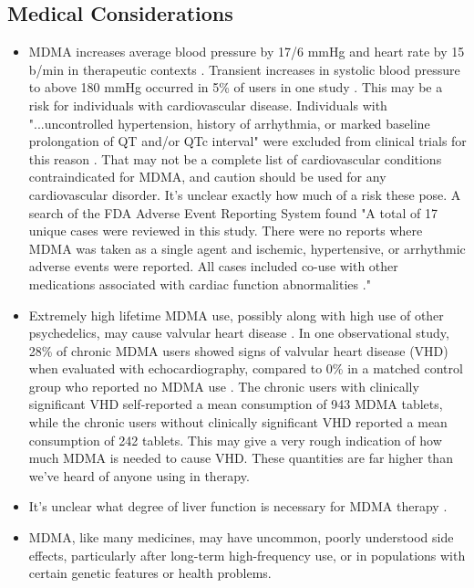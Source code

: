 \documentclass[12pt,letterpaper]{book}
\begin{document}
\subsection*{Medical Considerations}
\begin{itemize}
    \item MDMA increases average blood pressure by 17/6 mmHg and heart rate by 15 b/min in therapeutic contexts \cite{mitchellMDMAClinicalTrial}. Transient increases in systolic blood pressure to above 180 mmHg occurred in 5\% of users in one study \cite{vizeliActuteEffects}. This may be a risk for individuals with cardiovascular disease. Individuals with "...uncontrolled hypertension, history of arrhythmia, or marked baseline prolongation of QT and/or QTc interval" were excluded from clinical trials for this reason \cite{mitchellMDMAClinicalTrial2}. That may not be a complete list of cardiovascular conditions contraindicated for MDMA, and caution should be used for any cardiovascular disorder. It's unclear exactly how much of a risk these pose. A search of the FDA Adverse Event Reporting System found "A total of 17 unique cases were reviewed in this study. There were no reports where MDMA was taken as a single agent and ischemic, hypertensive, or arrhythmic adverse events were reported. All cases included co-use with other medications associated with cardiac function abnormalities \cite{makunts2023concomitant}."
    \item Extremely high lifetime MDMA use, possibly along with high use of other psychedelics, may cause valvular heart disease \cite{droogmans2007valvular,tagen2023valvular}. In one observational study, 28\% of chronic MDMA users showed signs of valvular heart disease (VHD) when evaluated with echocardiography, compared to 0\% in a matched control group who reported no MDMA use \cite{droogmans2007valvular}. The chronic users with clinically significant VHD self-reported a mean consumption of 943 MDMA tablets, while the chronic users without clinically significant VHD reported a mean consumption of 242 tablets. This may give a very rough indication of how much MDMA is needed to cause VHD. These quantities are far higher than we've heard of anyone using in therapy.
    \item It's unclear what degree of liver function is necessary for MDMA therapy \cite{krausCirrhosis}.
    \item MDMA, like many medicines, may have uncommon, poorly understood side effects, particularly after long-term high-frequency use, or in populations with certain genetic features or health problems.

\end{itemize}
\end{document}
